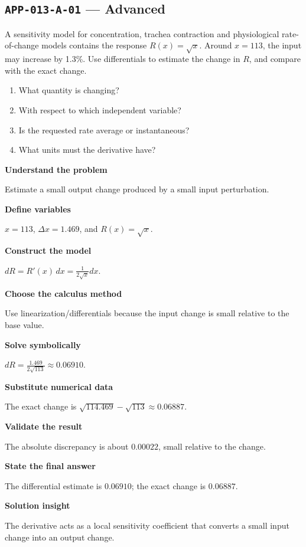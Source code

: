 \documentclass[11pt]{book}
\newcommand{\pid}[1]{\texttt{#1}}
\begin{document}
\subsection*{\pid{APP-013-A-01} — Advanced}
\begin{problembox}
A sensitivity model for concentration, trachea contraction and physiological rate-of-change models contains the response $R(x)=\sqrt{x}$. Around $x=113$, the input may increase by 1.3\%. Use differentials to estimate the change in $R$, and compare with the exact change.
\end{problembox}
\begin{promptbox}\begin{enumerate}
\item What quantity is changing?
\item With respect to which independent variable?
\item Is the requested rate average or instantaneous?
\item What units must the derivative have?
\end{enumerate}\end{promptbox}
\begin{solutionbox}
\textbf{Understand the problem}\par Estimate a small output change produced by a small input perturbation.\par\medskip
\textbf{Define variables}\par $x=113$, $\Delta x=1.469$, and $R(x)=\sqrt x$.\par\medskip
\textbf{Construct the model}\par $dR=R'(x)\,dx=\frac{1}{2\sqrt{x}}dx$.\par\medskip
\textbf{Choose the calculus method}\par Use linearization/differentials because the input change is small relative to the base value.\par\medskip
\textbf{Solve symbolically}\par $dR=\frac{1.469}{2\sqrt{113}}\approx 0.06910$.\par\medskip
\textbf{Substitute numerical data}\par The exact change is $\sqrt{114.469}-\sqrt{113}\approx 0.06887$.\par\medskip
\textbf{Validate the result}\par The absolute discrepancy is about $0.00022$, small relative to the change.\par\medskip
\textbf{State the final answer}\par The differential estimate is $0.06910$; the exact change is $0.06887$.\par\medskip
\textbf{Solution insight}\par The derivative acts as a local sensitivity coefficient that converts a small input change into an output change.\par\medskip
\end{solutionbox}
\end{document}
